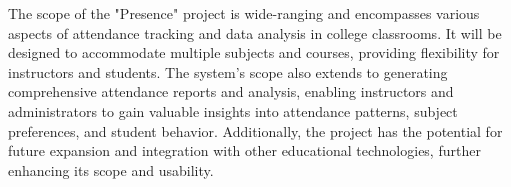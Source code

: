 The scope of the "Presence" project is wide-ranging and encompasses various aspects of attendance tracking and data analysis in college classrooms. It will be designed to accommodate multiple subjects and courses, providing flexibility for instructors and students. The system's scope also extends to generating comprehensive attendance reports and analysis, enabling instructors and administrators to gain valuable insights into attendance patterns, subject preferences, and student behavior. Additionally, the project has the potential for future expansion and integration with other educational technologies, further enhancing its scope and usability.
